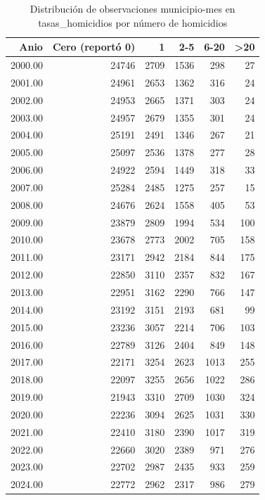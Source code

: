 \begin{table}[ht]
\centering
\caption{Distribución de observaciones municipio-mes en tasas\_homicidios por número de homicidios} 
\label{tab:muni_M5_distribucion_ceros_hom}
\begin{tabular}{rrrrrr}
  \toprule
Anio & Cero (reportó 0) & 1 & 2-5 & 6-20 & >20 \\ 
  \midrule
2000.00 & 24746 & 2709 & 1536 & 298 &  27 \\ 
  2001.00 & 24961 & 2653 & 1362 & 316 &  24 \\ 
  2002.00 & 24953 & 2665 & 1371 & 303 &  24 \\ 
  2003.00 & 24957 & 2679 & 1355 & 301 &  24 \\ 
  2004.00 & 25191 & 2491 & 1346 & 267 &  21 \\ 
  2005.00 & 25097 & 2536 & 1378 & 277 &  28 \\ 
  2006.00 & 24922 & 2594 & 1449 & 318 &  33 \\ 
  2007.00 & 25284 & 2485 & 1275 & 257 &  15 \\ 
  2008.00 & 24676 & 2624 & 1558 & 405 &  53 \\ 
  2009.00 & 23879 & 2809 & 1994 & 534 & 100 \\ 
  2010.00 & 23678 & 2773 & 2002 & 705 & 158 \\ 
  2011.00 & 23171 & 2942 & 2184 & 844 & 175 \\ 
  2012.00 & 22850 & 3110 & 2357 & 832 & 167 \\ 
  2013.00 & 22951 & 3162 & 2290 & 766 & 147 \\ 
  2014.00 & 23192 & 3151 & 2193 & 681 &  99 \\ 
  2015.00 & 23236 & 3057 & 2214 & 706 & 103 \\ 
  2016.00 & 22789 & 3126 & 2404 & 849 & 148 \\ 
  2017.00 & 22171 & 3254 & 2623 & 1013 & 255 \\ 
  2018.00 & 22097 & 3255 & 2656 & 1022 & 286 \\ 
  2019.00 & 21943 & 3310 & 2709 & 1030 & 324 \\ 
  2020.00 & 22236 & 3094 & 2625 & 1031 & 330 \\ 
  2021.00 & 22410 & 3180 & 2390 & 1017 & 319 \\ 
  2022.00 & 22660 & 3020 & 2389 & 971 & 276 \\ 
  2023.00 & 22702 & 2987 & 2435 & 933 & 259 \\ 
  2024.00 & 22772 & 2962 & 2317 & 986 & 279 \\ 
   \bottomrule
\end{tabular}
\end{table}
